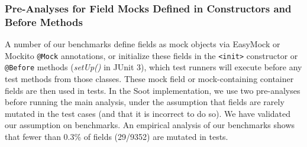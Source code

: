 




\subsubsection{Pre-Analyses for Field Mocks Defined in Constructors and Before Methods}
\label{subsubsec:pre-analysis} 
A number of our benchmarks define fields as mock objects via EasyMock or Mockito \texttt{@Mock} annotations, or initialize these fields in the \texttt{<init>} constructor or \texttt{@Before} methods (\textit{setUp()} in JUnit 3), which test runners will execute before any test methods from those classes. These mock field or mock-containing container fields are then used in tests. In the Soot implementation, we use two pre-analyses before running the main analysis, under the assumption that fields are rarely mutated in the test cases (and that it is incorrect to do so). We have validated our assumption on benchmarks. An empirical analysis of our benchmarks shows that fewer than 0.3\% of fields (29/9352) are mutated in tests.

